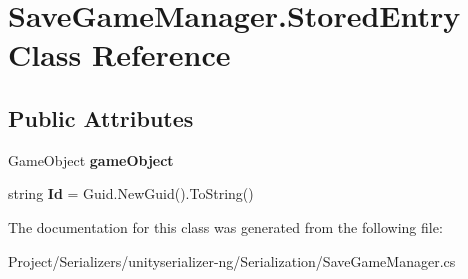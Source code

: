 \hypertarget{class_save_game_manager_1_1_stored_entry}{}\section{Save\+Game\+Manager.\+Stored\+Entry Class Reference}
\label{class_save_game_manager_1_1_stored_entry}
\subsection*{Public Attributes}
\begin{DoxyCompactItemize}
\item 
\mbox{\label{class_save_game_manager_1_1_stored_entry_a67b3211b5145ae167bf5cfa817f4894f}} 
Game\+Object {\bfseries game\+Object}
\item 
\mbox{\label{class_save_game_manager_1_1_stored_entry_ae7208d742a7ac6d0fce5e5af39330e0c}} 
string {\bfseries Id} = Guid.\+New\+Guid().To\+String()
\end{DoxyCompactItemize}


The documentation for this class was generated from the following file\+:\begin{DoxyCompactItemize}
\item 
Project/\+Serializers/unityserializer-\/ng/\+Serialization/Save\+Game\+Manager.\+cs\end{DoxyCompactItemize}
